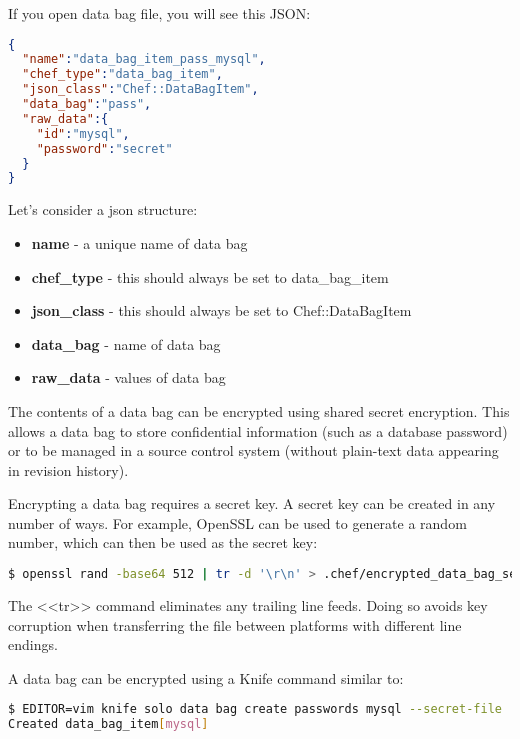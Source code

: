 If you open data bag file, you will see this JSON:

\begin{lstlisting}[language=JSON,label=lst:my-cloud-chef-databag10,title=my-cloud/data\_bags/pass/mysql.json]
{
  "name":"data_bag_item_pass_mysql",
  "chef_type":"data_bag_item",
  "json_class":"Chef::DataBagItem",
  "data_bag":"pass",
  "raw_data":{
    "id":"mysql",
    "password":"secret"
  }
}
\end{lstlisting}

Let's consider a json structure:

\begin{itemize}
  \item \textbf{name} - a unique name of data bag
  \item \textbf{chef\_type} - this should always be set to data\_bag\_item
  \item \textbf{json\_class} - this should always be set to Chef::DataBagItem
  \item \textbf{data\_bag} - name of data bag
  \item \textbf{raw\_data} - values of data bag
\end{itemize}

The contents of a data bag can be encrypted using shared secret encryption. This allows a data bag to store confidential information (such as a database password) or to be managed in a source control system (without plain-text data appearing in revision history).

Encrypting a data bag requires a secret key. A secret key can be created in any number of ways. For example, OpenSSL can be used to generate a random number, which can then be used as the secret key:

\begin{lstlisting}[language=Bash,label=lst:my-cloud-chef-databag5]
$ openssl rand -base64 512 | tr -d '\r\n' > .chef/encrypted_data_bag_secret
\end{lstlisting}

The <<tr>> command eliminates any trailing line feeds. Doing so avoids key corruption when transferring the file between platforms with different line endings.

A data bag can be encrypted using a Knife command similar to:

\begin{lstlisting}[language=Bash,label=lst:my-cloud-chef-databag6]
$ EDITOR=vim knife solo data bag create passwords mysql --secret-file .chef/encrypted_data_bag_secret
Created data_bag_item[mysql]
\end{lstlisting}

